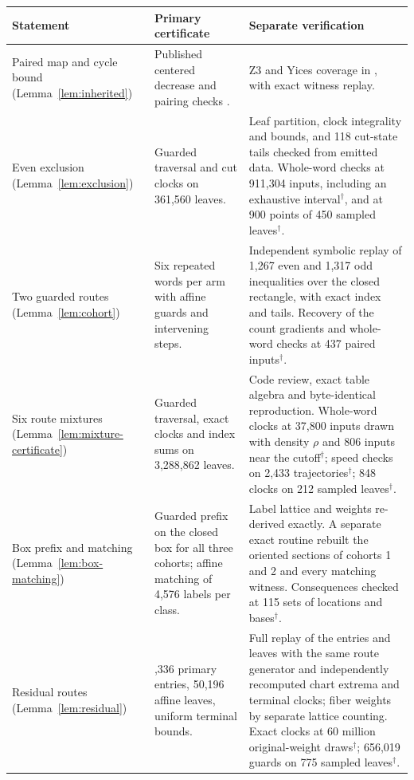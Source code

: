 \documentclass[11pt,reqno]{amsart}
\theoremstyle{remark}
\begin{document}
\begin{table}[htbp]
\footnotesize
\setlength{\tabcolsep}{4pt}
\renewcommand{\arraystretch}{1.12}
\centering
\begin{tabular}{@{}>{\raggedright\arraybackslash}p{.2\linewidth}>{\raggedright\arraybackslash}p{.31\linewidth}>{\raggedright\arraybackslash}p{.43\linewidth}@{}}
\hline
Statement & Primary certificate & Separate verification\\
\hline
Paired map and cycle bound (Lemma~\ref{lem:inherited}) &
Published centered decrease and pairing checks \cite{G6}. &
Z3 and Yices coverage in \cite{G6}, with exact witness replay.\\
Even exclusion (Lemma~\ref{lem:exclusion}) &
Guarded traversal and cut clocks on 361,560 leaves. &
Leaf partition, clock integrality and bounds, and 118 cut-state tails checked from emitted data. Whole-word checks at 911,304 inputs, including an exhaustive interval\(^\dagger\), and at 900 points of 450 sampled leaves\(^\dagger\).\\
Two guarded routes (Lemma~\ref{lem:cohort}) &
Six repeated words per arm with affine guards and intervening steps. &
Independent symbolic replay of 1,267 even and 1,317 odd inequalities over the closed rectangle, with exact index and tails. Recovery of the count gradients and whole-word checks at 437 paired inputs\(^\dagger\).\\
Six route mixtures (Lemma~\ref{lem:mixture-certificate}) &
Guarded traversal, exact clocks and index sums on 3,288,862 leaves. &
Code review, exact table algebra and byte-identical reproduction. Whole-word clocks at 37,800 inputs drawn with density \(\rho\) and 806 inputs near the cutoff\(^\dagger\); speed checks on 2,433 trajectories\(^\dagger\); 848 clocks on 212 sampled leaves\(^\dagger\).\\
Box prefix and matching (Lemma~\ref{lem:box-matching}) &
Guarded prefix on the closed box for all three cohorts; affine matching of 4,576 labels per class. &
Label lattice and weights re-derived exactly. A separate exact routine rebuilt the oriented sections of cohorts 1 and 2 and every matching witness. Consequences checked at 115 sets of locations and bases\(^\dagger\).\\
Residual routes (Lemma~\ref{lem:residual}) &
6,336 primary entries, 50,196 affine leaves, uniform terminal bounds. &
Full replay of the entries and leaves with the same route generator and independently recomputed chart extrema and terminal clocks; fiber weights by separate lattice counting. Exact clocks at 60 million original-weight draws\(^\dagger\); 656,019 guards on 775 sampled leaves\(^\dagger\).\\

\end{tabular}
\end{table}
\end{document}
